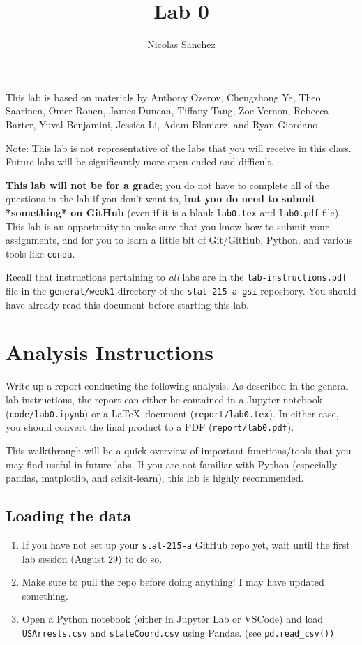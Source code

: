 \documentclass[letterpaper,12pt]{article}
\title{Lab 0}
\author{Nicolas Sanchez}
\begin{document}
\maketitle

This lab is based on materials by Anthony Ozerov, Chengzhong Ye, Theo Saarinen, Omer Ronen, James Duncan, Tiffany Tang, Zoe Vernon, Rebecca Barter, Yuval Benjamini, Jessica Li, Adam Bloniarz, and Ryan Giordano.

Note: This lab is not representative of the labs that you will receive in this class. Future labs will be significantly more open-ended and difficult.

\textbf{This lab will not be for a grade}; you do not have to complete all of the questions in the lab if you don't want to, \textbf{but you do need to submit *something* on GitHub} (even if it is a blank \texttt{lab0.tex} and \texttt{lab0.pdf} file). This lab is an opportunity to make sure that you know how to submit your assignments, and for you to learn a little bit of Git/GitHub, Python, and various tools like \texttt{conda}.

Recall that instructions pertaining to \textit{all} labs are in the \texttt{lab-instructions.pdf} file in the \texttt{general/week1} directory of the \texttt{stat-215-a-gsi} repository. You should have already read this document before starting this lab.

\section{Analysis Instructions}

Write up a report conducting the following analysis. As described in the general lab instructions, the report can either be contained in a Jupyter notebook (\texttt{code/lab0.ipynb}) or a \LaTeX\ document (\texttt{report/lab0.tex}). In either case, you should convert the final product to a PDF (\texttt{report/lab0.pdf}).

This walkthrough will be a quick overview of important functions/tools that you may find useful in future labs. If you are not familiar with Python (especially pandas, matplotlib, and scikit-learn), this lab is highly recommended.

\subsection{Loading the data}
\begin{enumerate}
\item If you have not set up your \texttt{stat-215-a} GitHub repo yet, wait until the first lab session (August 29) to do so.
\item Make sure to pull the repo before doing anything! I may have updated something.
\item Open a Python notebook (either in Jupyter Lab or VSCode) and load \texttt{USArrests.csv} and \texttt{stateCoord.csv} using Pandas. (see \texttt{pd.read\_csv())}
\end{enumerate}
\end{document}
